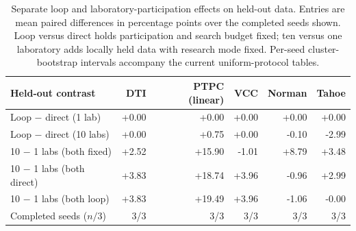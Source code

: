 \begin{table}[t]
\centering\small
\setlength{\tabcolsep}{3pt}
\begin{tabular}{lrrrrr}
\toprule
Held-out contrast & DTI & PTPC (linear) & VCC & Norman & Tahoe \\
\midrule
Loop $-$ direct (1 lab) & +0.00 & +0.00 & +0.00 & +0.00 & +0.00 \\
Loop $-$ direct (10 labs) & +0.00 & +0.75 & +0.00 & -0.10 & -2.99 \\
10 $-$ 1 labs (both fixed) & +2.52 & +15.90 & -1.01 & +8.79 & +3.48 \\
10 $-$ 1 labs (both direct) & +3.83 & +18.74 & +3.96 & -0.96 & +2.99 \\
10 $-$ 1 labs (both loop) & +3.83 & +19.49 & +3.96 & -1.06 & -0.00 \\
\midrule
Completed seeds ($n/3$) & 3/3 & 3/3 & 3/3 & 3/3 & 3/3 \\
\bottomrule
\end{tabular}
\caption{Separate loop and laboratory-participation effects on held-out data. Entries are mean paired differences in percentage points over the completed seeds shown. Loop versus direct holds participation and search budget fixed; ten versus one laboratory adds locally held data with research mode fixed. Per-seed cluster-bootstrap intervals accompany the current uniform-protocol tables.}
\label{tab:unified-heldout-effects}
\end{table}

